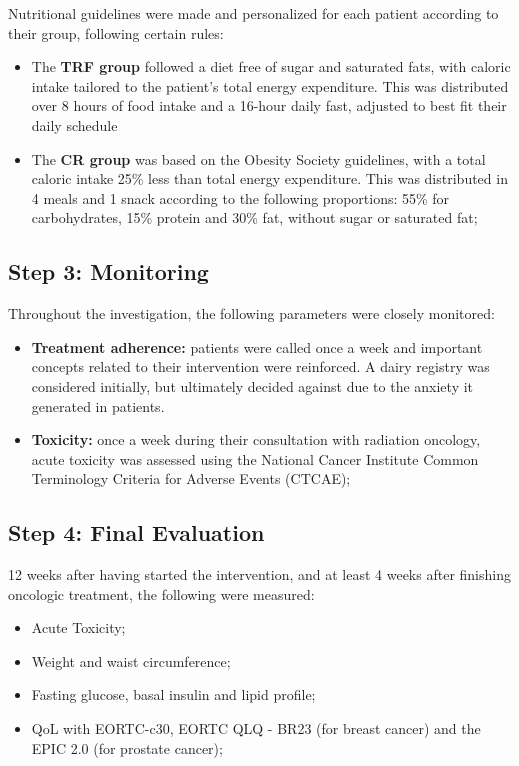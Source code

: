 \documentclass[journal,article,submit,pdftex,moreauthors]{Definitions/mdpi}
\begin{document}
Nutritional guidelines were made and personalized for each patient according to their group, following certain rules:
\\
\begin{itemize}
\item	The \textbf{TRF group} {\color{blue}followed a diet free of sugar and saturated fats, with caloric intake tailored to the patient's total energy expenditure. This was distributed over 8 hours of food intake and a 16-hour daily fast, adjusted to best fit their daily schedule}
\item	The \textbf{CR group} was based on the Obesity Society guidelines, with a total caloric intake 25\% less than total energy expenditure. This was distributed in 4 meals and 1 snack according to the following proportions: 55\% for carbohydrates, 15\% protein and 30\% fat, without sugar or saturated fat;
\end{itemize}

\subsection{Step 3: Monitoring}

Throughout the investigation, the following parameters were closely monitored:
\begin{itemize}
\item	\textbf{Treatment adherence:} patients were called once a week and important concepts related to their intervention were reinforced. A dairy registry was considered initially, but ultimately decided against due to the anxiety it generated in patients. 
\item	\textbf{Toxicity:} once a week during their consultation with radiation oncology, acute toxicity was assessed using the National Cancer Institute Common Terminology Criteria for Adverse Events (CTCAE);
\end{itemize}

\subsection{Step 4: Final Evaluation}

12 weeks after having started the intervention, and at least 4 weeks after finishing oncologic treatment, the following were measured:
\begin{itemize}
\item	Acute Toxicity;
\item	Weight and waist circumference;
\item	Fasting glucose, basal insulin and lipid profile;
\item	QoL with EORTC-c30, EORTC QLQ - BR23 (for breast cancer) and the EPIC 2.0 (for prostate cancer);
\end{itemize}
\end{document}
